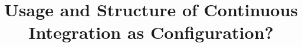 \documentclass[10pt,conference]{IEEEtran}
\begin{document}
\title{Usage and Structure of Continuous Integration as Configuration?}


\maketitle           %


\end{document}
